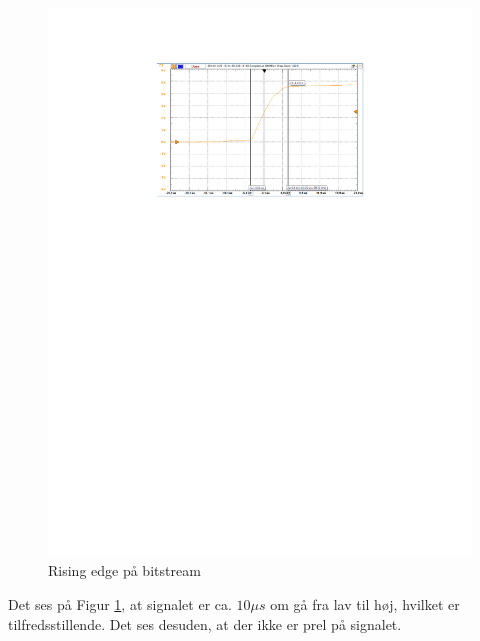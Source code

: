 \begin{figure}[h]
	\centering
	\includegraphics[width={\textwidth},trim=150 520 150 80, clip=true]{../Implementering/billeder/bitstream.pdf}
	\caption{Rising edge på bitstream}
	\label{fig:CD_bitstream}
\end{figure}
\newpage
Det ses på Figur \ref{fig:CD_bitstream}, at signalet er ca. $10 \mu s$ om gå fra lav til høj, hvilket er tilfredsstillende. Det ses desuden, at der ikke er prel på signalet.\\